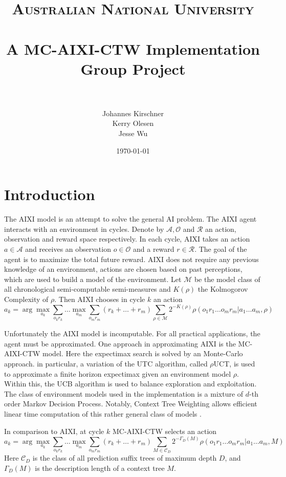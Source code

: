 \documentclass[paper=a4, fontsize=11pt]{scrartcl} %
\title{	
\normalfont \normalsize 
\textsc{Australian National University} \\ [25pt] %
\horrule{0.5pt} \\[0.4cm] %
\huge A MC-AIXI-CTW Implementation\\ Group Project \\ %
\horrule{2pt} \\[0.5cm] %
}
\author{Johannes Kirschner\\ Kerry Olesen\\ Jesse Wu} %
\date{\normalsize\today} %
\numberwithin{equation}{section} %
\numberwithin{figure}{section} %
\numberwithin{table}{section} %
\begin{document}
\maketitle %

\section{Introduction}
The AIXI model \cite{Hutter:04uaibook} is an attempt to solve the general AI problem. The AIXI agent interacts with an environment in cycles. Denote by $\mathcal{A}, \mathcal{O}$ and $\mathcal{R}$ an action, observation and reward space respectively. In each cycle, AIXI takes an action $a \in \mathcal{A}$ and receives an observation $o \in \mathcal{O}$ and a reward $r \in \mathcal{R}$. The goal of the agent is to maximize the total future reward. AIXI does not require any previous knowledge of an environment, actions are chosen based on past perceptions, which are used to build a model of the environment. Let $\mathcal{M}$ be the model class of all chronological semi-computable semi-measures and $K(\rho)$ the Kolmogorov Complexity of $\rho$. Then AIXI chooses in cycle $k$ an action
\[ a_k = \arg \max_{a_k} \sum_{o_kr_k} \dots \max_{a_m} \sum_{o_m r_m} (r_k + \dots + r_m) \sum_{\rho \in \mathcal{M}}2^{-K(\rho)} \rho(o_1r_1\dots o_m r_m|a_1\dots a_m, \rho) \]


\bigskip

Unfortunately the AIXI model is incomputable. For all practical applications, the agent must be approximated. One approach in approximating AIXI is the MC-AIXI-CTW \cite{VNHS09} model. Here the expectimax search is solved by an Monte-Carlo approach. in particular, a variation of the UTC \cite{UCT} algorithm, called $\rho$UCT, is used to approximate a finite horizon expectimax given an environment model $\rho$. Within this, the UCB \cite{Auer02} algorithm is used to balance exploration and exploitation. The class of environment models used in the implementation is a mixture of $d$-th order Markov Decision Process. Notably, Context Tree Weighting allows efficient linear time computation of this rather general class of models \cite{CTW}.

\bigskip

In comparison to AIXI, at cycle $k$ MC-AIXI-CTW selects an action
\[ a_k = \arg \max_{a_k} \sum_{o_kr_k} \dots \max_{a_m} \sum_{o_m r_m} (r_k + \dots + r_m) \sum_{M \in \mathcal{C}_D}2^{-\Gamma_D(M)} \rho(o_1r_1\dots o_m r_m|a_1\dots a_m, M) \]
Here $\mathcal{C}_D$ is the class of all prediction suffix trees of maximum depth $D$, and $\Gamma_D(M)$ is the description length of a context tree $M$.
\end{document}
